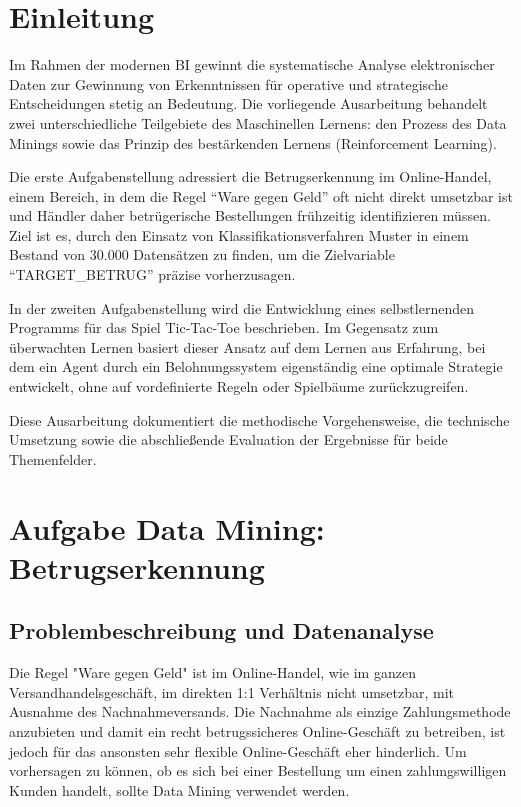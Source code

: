 \newpage

\chapter{Einleitung}

Im Rahmen der modernen \ac{BI} gewinnt die systematische Analyse elektronischer Daten zur Gewinnung von Erkenntnissen für operative und strategische Entscheidungen stetig an Bedeutung. Die vorliegende Ausarbeitung behandelt zwei unterschiedliche Teilgebiete des Maschinellen Lernens: den Prozess des Data Minings sowie das Prinzip des bestärkenden Lernens (Reinforcement Learning).

Die erste Aufgabenstellung adressiert die Betrugserkennung im Online-Handel, einem Bereich, in dem die Regel ``Ware gegen Geld'' oft nicht direkt umsetzbar ist und Händler daher betrügerische Bestellungen frühzeitig identifizieren müssen. Ziel ist es, durch den Einsatz von Klassifikationsverfahren Muster in einem Bestand von 30.000 Datensätzen zu finden, um die Zielvariable ``TARGET\_BETRUG'' präzise vorherzusagen.

In der zweiten Aufgabenstellung wird die Entwicklung eines selbstlernenden Programms für das Spiel Tic-Tac-Toe beschrieben. Im Gegensatz zum überwachten Lernen basiert dieser Ansatz auf dem Lernen aus Erfahrung, bei dem ein Agent durch ein Belohnungssystem eigenständig eine optimale Strategie entwickelt, ohne auf vordefinierte Regeln oder Spielbäume zurückzugreifen.

Diese Ausarbeitung dokumentiert die methodische Vorgehensweise, die technische Umsetzung sowie die abschließende Evaluation der Ergebnisse für beide Themenfelder.


\chapter{Aufgabe Data Mining: Betrugserkennung}

\section{Problembeschreibung und Datenanalyse}

Die Regel "Ware gegen Geld" ist im Online-Handel, wie im 
ganzen Versandhandelsgeschäft, im direkten 1:1 Verhältnis nicht umsetzbar, mit Ausnahme 
des Nachnahmeversands. Die Nachnahme als einzige Zahlungsmethode anzubieten und 
damit ein recht betrugssicheres Online-Geschäft zu betreiben, ist jedoch für das ansonsten 
sehr flexible Online-Geschäft eher hinderlich. Um vorhersagen zu können, ob es sich bei einer Bestellung um einen zahlungswilligen Kunden handelt, sollte Data Mining verwendet werden.

